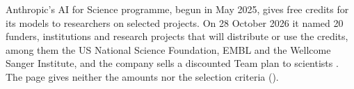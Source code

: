 Anthropic's AI for Science programme, begun in May 2025, gives free credits
for its models to researchers on selected projects. On 28 October 2026 it
named 20 funders, institutions and research projects that will distribute or
use the credits, among them the US National Science Foundation, EMBL and the
Wellcome Sanger Institute, and the company sells a discounted Team plan to
scientists \parencite{anthropic2026aiforscience}. The page gives neither the
amounts nor the selection criteria ().
